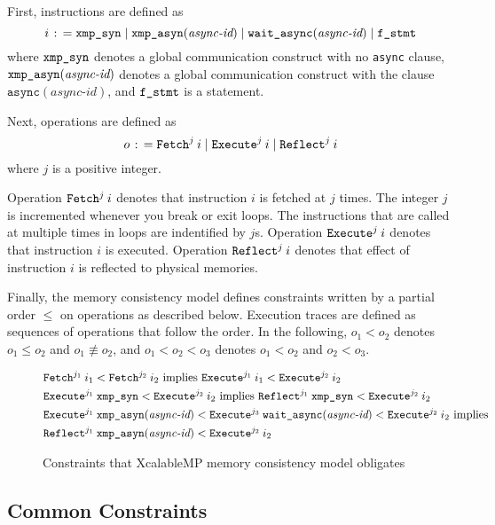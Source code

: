 First, instructions are defined as
\[
i \mathrel{\colon\!=} \texttt{xmp\_syn} \mid \texttt{xmp\_asyn}(\textit{async-id}) \mid \texttt{wait\_async}(\textit{async-id}) \mid \texttt{f\_stmt}
\]
where $\texttt{xmp\_syn}$ denotes a global communication construct with no
\texttt{async} clause, $\texttt{xmp\_asyn}(\textit{async-id})$ denotes a global
communication construct with the clause
$\texttt{async}(\textit{async-id})$,
and $\texttt{f\_stmt}$ is a statement.

Next, operations are defined as
\[
o \mathrel{\colon\!=} \texttt{Fetch}^{j} \: {i} \mid \texttt{Execute}^{j} \: {i} \mid \texttt{Reflect}^{j} \: {i}
\]
where $j$ is a positive integer.

Operation $\texttt{Fetch}^{j} \: {i}$ denotes that instruction $i$ is fetched at $j$
times.  The integer $j$ is incremented whenever you break or exit
loops.  The instructions that are called at multiple times in loops
are indentified by $j$s.  Operation $\texttt{Execute}^{j} \: {i}$ denotes that
instruction $i$ is executed.  Operation $\texttt{Reflect}^{j} \: {i}$ denotes that effect
of instruction $i$ is reflected to physical memories.

Finally, the memory consistency model defines constraints written by a
partial order $\leq$ on operations as described below.  Execution
traces are defined as sequences of operations that follow the order.
In the following, $o_1 < o_2$ denotes $o_1 \leq o_2$ and $o_1
\not\equiv o_2$, and $o_1 < o_2 < o_3$ denotes $o_1 < o_2$ and $o_2 <
o_3$.

{
\renewcommand{\theequation}{\roman{equation}}
\begin{figure}[htbp]
\begin{align}
& \texttt{Fetch}^{j_1} \: {i_1} < \texttt{Fetch}^{j_2} \: {i_2} \mbox{ implies } \texttt{Execute}^{j_1} \: {i_1} < \texttt{Execute}^{j_2} \: {i_2} \label{constraints:fetchorder}\\
& \texttt{Execute}^{j_1} \: {\texttt{xmp\_syn}} < \texttt{Execute}^{j_2} \: {i_2} \mbox{ implies } \texttt{Reflect}^{j_1} \: {\texttt{xmp\_syn}} < \texttt{Execute}^{j_2} \: {i_2} \label{constraints:synchronous}\\
& \texttt{Execute}^{j_1} \: {\texttt{xmp\_asyn}(\textit{async-id})} < \texttt{Execute}^{j_3} \: {\texttt{wait\_async}(\textit{async-id})} < \texttt{Execute}^{j_2} \: {i_2} \mbox{ implies} \nonumber\\
& \texttt{Reflect}^{j_1} \: {\texttt{xmp\_asyn}(\textit{async-id})} < \texttt{Execute}^{j_2} \: {i_2} \label{constraints:asynchronous}
\end{align}
\caption{Constraints that XcalableMP memory consistency model obligates}\label{fig:constraints}
\end{figure}
}

\subsection{Common Constraints}

